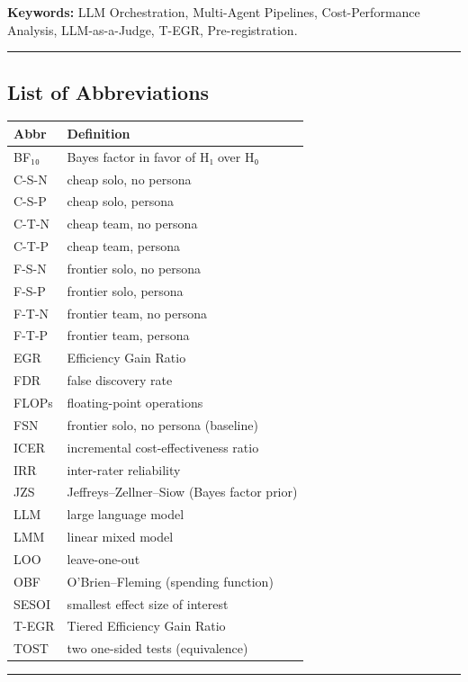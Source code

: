 \documentclass[11pt,a4paper]{article}
\begin{document}
\textbf{Keywords:} LLM Orchestration, Multi-Agent Pipelines, Cost-Performance
Analysis, LLM-as-a-Judge, T-EGR, Pre-registration.

\hrule


\subsection{List of Abbreviations}

\begin{table}[htbp]
\centering
\begin{tabular}{ll}
\toprule
Abbr & Definition \\
\midrule
BF₁₀ & Bayes factor in favor of H₁ over H₀ \\
C-S-N & cheap solo, no persona \\
C-S-P & cheap solo, persona \\
C-T-N & cheap team, no persona \\
C-T-P & cheap team, persona \\
F-S-N & frontier solo, no persona \\
F-S-P & frontier solo, persona \\
F-T-N & frontier team, no persona \\
F-T-P & frontier team, persona \\
EGR & Efficiency Gain Ratio \\
FDR & false discovery rate \\
FLOPs & floating-point operations \\
FSN & frontier solo, no persona (baseline) \\
ICER & incremental cost-effectiveness ratio \\
IRR & inter-rater reliability \\
JZS & Jeffreys–Zellner–Siow (Bayes factor prior) \\
LLM & large language model \\
LMM & linear mixed model \\
LOO & leave-one-out \\
OBF & O'Brien–Fleming (spending function) \\
SESOI & smallest effect size of interest \\
T-EGR & Tiered Efficiency Gain Ratio \\
TOST & two one-sided tests (equivalence) \\
\bottomrule
\end{tabular}
\end{table}


\hrule
\end{document}
